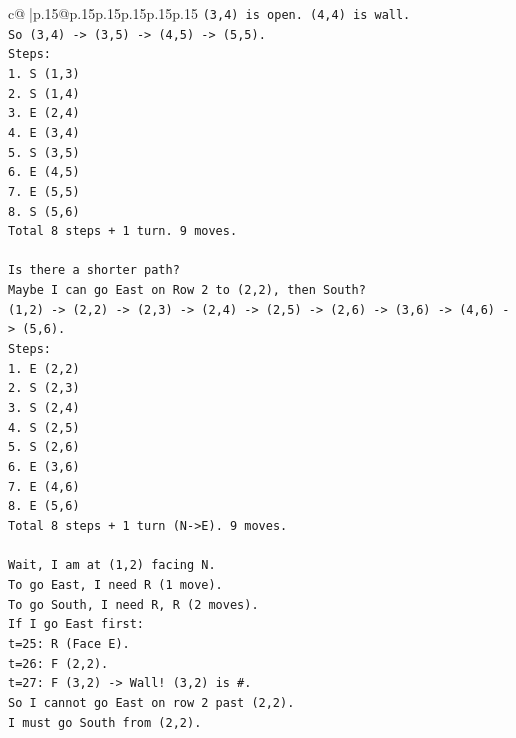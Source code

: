 \documentclass{article}
\begin{document}
{\begin{supertabular}{c@{$\;$}|p{.15\linewidth}@{}p{.15\linewidth}p{.15\linewidth}p{.15\linewidth}p{.15\linewidth}p{.15\linewidth}}
{{{\texttt{(3,4) is open. (4,4) is wall.} \\
\texttt{So (3,4) {-}> (3,5) {-}> (4,5) {-}> (5,5).} \\
\texttt{Steps:} \\
\texttt{1. S (1,3)} \\
\texttt{2. S (1,4)} \\
\texttt{3. E (2,4)} \\
\texttt{4. E (3,4)} \\
\texttt{5. S (3,5)} \\
\texttt{6. E (4,5)} \\
\texttt{7. E (5,5)} \\
\texttt{8. S (5,6)} \\
\texttt{Total 8 steps + 1 turn. 9 moves.} \\
\\ 
\texttt{Is there a shorter path?} \\
\texttt{Maybe I can go East on Row 2 to (2,2), then South?} \\
\texttt{(1,2) {-}> (2,2) {-}> (2,3) {-}> (2,4) {-}> (2,5) {-}> (2,6) {-}> (3,6) {-}> (4,6) {-}> (5,6).} \\
\texttt{Steps:} \\
\texttt{1. E (2,2)} \\
\texttt{2. S (2,3)} \\
\texttt{3. S (2,4)} \\
\texttt{4. S (2,5)} \\
\texttt{5. S (2,6)} \\
\texttt{6. E (3,6)} \\
\texttt{7. E (4,6)} \\
\texttt{8. E (5,6)} \\
\texttt{Total 8 steps + 1 turn (N{-}>E). 9 moves.} \\
\\ 
\texttt{Wait, I am at (1,2) facing N.} \\
\texttt{To go East, I need R (1 move).} \\
\texttt{To go South, I need R, R (2 moves).} \\
\texttt{If I go East first:} \\
\texttt{t=25: R (Face E).} \\
\texttt{t=26: F (2,2).} \\
\texttt{t=27: F (3,2) {-}> Wall! (3,2) is \#.} \\
\texttt{So I cannot go East on row 2 past (2,2).} \\
\texttt{I must go South from (2,2).} \\
}}}
\end{supertabular}}
\end{document}
